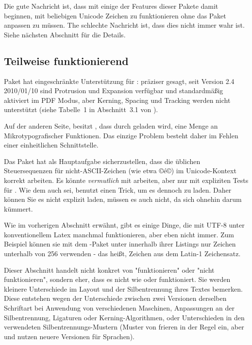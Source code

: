 \documentclass{lltxdoc}
\begin{document}
Die gute Nachricht ist, dass mit \lualatex einige der Features dieser Pakete 
damit beginnen, mit beliebigen Unicode Zeichen zu funktionieren ohne das Paket 
anpassen zu müssen. The schlechte Nachricht ist, dass dies nicht immer wahr ist.
 Siehe nächsten Abschnitt für die Details.

\subsection{Teilweise funktionierend}\label{partial}

Paket  hat eingeschränkte Unterstützung für \luatex: präziser 
gesagt, seit Version 2.4 2010/01/10 sind Protrusion und Expansion verfügbar und 
standardmäßig aktiviert im PDF Modus, aber Kerning, Spacing und Tracking werden 
nicht unterstützt (siehe Tabelle~1 in Abschnitt~3.1 von ).

Auf der anderen Seite, besitzt , dass durch  
geladen wird, eine Menge an Mikrotypografischer Funktionen. Das einzige Problem
besteht daher im Fehlen einer einheitlichen Schnittstelle.



Das Paket  hat als Hauptaufgabe sicherzustellen, dass die üblichen
Steuersequenzen für nicht-ASCII-Zeichen (wie etwa ©\'e©) im Unicode-Kontext
korrekt arbeiten. Es könnte \emph{vermutlich} mit \luatex arbeiten, aber nur mit
expliziten Tests für \xetex. Wie dem auch sei,  benutzt einen
Trick, um es dennoch zu laden. Daher können Sie es nicht explizit laden, müssen
es auch nicht, da  sich ohnehin darum kümmert.


Wie im vorherigen Abschnitt erwähnt, gibt es einige Dinge, die mit UTF-8 unter 
konventionellem Latex manchmal funktionieren, aber eben nicht immer. Zum 
Beispiel können sie mit dem -Paket unter \lualatex innerhalb 
ihrer Listings nur Zeichen unterhalb von 256 verwenden - das heißt, Zeichen aus 
dem Latin-1 Zeichensatz.


Dieser Abschnitt handelt nicht konkret von "funktionieren" oder "nicht 
funktionieren", sondern eher, dass es nicht wie \pdftex oder \xetex
funktioniert. Sie werden kleinere Unterschiede im Layout und der Silbentrennung
ihres Textes bemerken. Diese entstehen wegen der Unterschiede zwischen zwei
Versionen derselben Schriftart bei Anwendung von verschiedenen Maschinen, 
Anpassungen an der Silbentrennung, Ligaturen oder Kerning-Algorithmen, oder 
Unterschieden in den verwendeten Silbentrennungs-Mustern (Muster von \pdftex
frieren in der Regel ein, aber \luatex und \xetex nutzen neuere Versionen 
für Sprachen).
\end{document}
